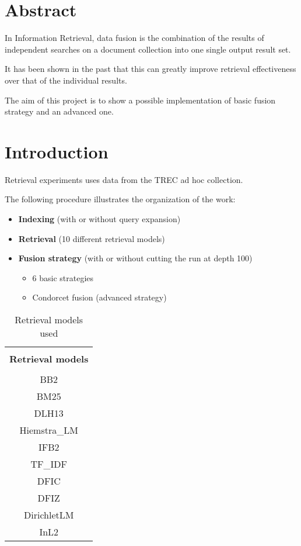 


    \printTitle
    \newpage
    \tableofcontents
    \newpage
    \section{Abstract}
    In Information Retrieval, data fusion is the combination of the results
    of independent searches on a document collection into one single output
    result set.

    It has been shown in the past that this can greatly improve retrieval
    effectiveness over that of the individual results.

    The aim of this project is to show a possible implementation of basic
    fusion strategy and an advanced one.


    \section{Introduction}

    Retrieval experiments uses data from the TREC ad hoc collection.
    
    The following procedure illustrates the organization of the work:

    \begin{itemize}
        \item \textbf{Indexing} (with or without query expansion)
        \item \textbf{Retrieval} (10 different retrieval models)
        \item \textbf{Fusion strategy} (with or without cutting the run at depth 100)
            \begin{itemize}
                \item 6 basic strategies
                \item Condorcet fusion (advanced strategy)
            \end{itemize}
    \end{itemize}
    
    \begin{table}[H]
        \centering
        \begin{tabular}{|c|}
        \hline \\
        \textbf{Retrieval models} \\
        \hline \\
        BB2 \\
        BM25 \\
        DLH13 \\
        Hiemstra\_LM \\
        IFB2 \\
        TF\_IDF \\
        DFIC \\
        DFIZ \\
        DirichletLM \\
        InL2 \\
        \hline
        \end{tabular}
        \caption{Retrieval models used}
    \end{table}

